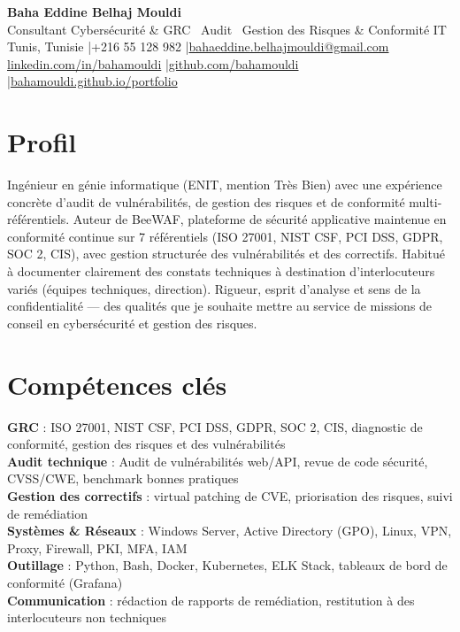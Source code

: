 \documentclass[a4paper,9pt]{article}
\begin{document}
\begin{center}
{\LARGE\bfseries\color{navy} Baha Eddine Belhaj Mouldi}\\[2pt]
{\normalsize\color{navy} Consultant Cybersécurité \& GRC \textbar\ Audit \textbar\ Gestion des Risques \& Conformité IT}\\[3pt]
{\small Tunis, Tunisie \quad|\quad +216 55 128 982 \quad|\quad \href{mailto:bahaeddine.belhajmouldi@gmail.com}{bahaeddine.belhajmouldi@gmail.com}}\\[1pt]
{\small \href{https://www.linkedin.com/in/bahamouldi}{linkedin.com/in/bahamouldi} \quad|\quad \href{https://github.com/bahamouldi}{github.com/bahamouldi} \quad|\quad \href{https://bahamouldi.github.io/portfolio/}{bahamouldi.github.io/portfolio}}
\end{center}
\vspace{1pt}
\section{Profil}
Ingénieur en génie informatique (ENIT, mention Très Bien) avec une expérience concrète d'audit de vulnérabilités, de gestion des risques et de conformité multi-référentiels. Auteur de BeeWAF, plateforme de sécurité applicative maintenue en conformité continue sur 7 référentiels (ISO 27001, NIST CSF, PCI DSS, GDPR, SOC 2, CIS), avec gestion structurée des vulnérabilités et des correctifs. Habitué à documenter clairement des constats techniques à destination d'interlocuteurs variés (équipes techniques, direction). Rigueur, esprit d'analyse et sens de la confidentialité --- des qualités que je souhaite mettre au service de missions de conseil en cybersécurité et gestion des risques.
\section{Compétences clés}
\textbf{GRC} : ISO 27001, NIST CSF, PCI DSS, GDPR, SOC 2, CIS, diagnostic de conformité, gestion des risques et des vulnérabilités\\[0.3pt]
\textbf{Audit technique} : Audit de vulnérabilités web/API, revue de code sécurité, CVSS/CWE, benchmark bonnes pratiques\\[0.3pt]
\textbf{Gestion des correctifs} : virtual patching de CVE, priorisation des risques, suivi de remédiation\\[0.3pt]
\textbf{Systèmes \& Réseaux} : Windows Server, Active Directory (GPO), Linux, VPN, Proxy, Firewall, PKI, MFA, IAM\\[0.3pt]
\textbf{Outillage} : Python, Bash, Docker, Kubernetes, ELK Stack, tableaux de bord de conformité (Grafana)\\[0.3pt]
\textbf{Communication} : rédaction de rapports de remédiation, restitution à des interlocuteurs non techniques
\end{document}
